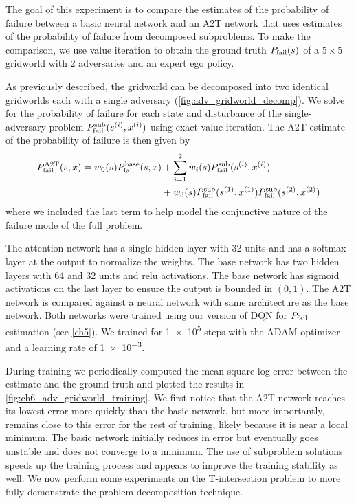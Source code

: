 The goal of this experiment is to compare the estimates of the probability of failure between a basic neural network and an A2T network that uses estimates of the probability of failure from decomposed subproblems. To make the comparison, we use value iteration to obtain the ground truth $P_{\rm fail}(s)$ of a $5 \times 5$ gridworld with \num{2} adversaries and an expert ego policy. 

As previously described, the gridworld can be decomposed into two identical gridworlds each with a single adversary (\cref{fig:adv_gridworld_decomp}). We solve for the probability of failure for each state and disturbance of the single-adversary problem $P^{\rm sub}_{\rm fail}(s^{(i)}, x^{(i)})$ using exact value iteration. The A2T estimate of the probability of failure is then given by
\begin{equation}
\begin{split}
    P^{\rm A2T}_{\rm fail}(s, x) = w_0(s) P_{\rm fail}^{\rm base}(s, x) &+ \sum_{i=1}^2 w_i(s) P^{\rm sub}_{\rm fail}(s^{(i)}, x^{(i)}) \\
    &+ w_3(s) P^{\rm sub}_{\rm fail}(s^{(1)}, x^{(1)})P^{\rm sub}_{\rm fail}(s^{(2)}, x^{(2)})
\end{split}
\end{equation}
where we included the last term to help model the conjunctive nature of the failure mode of the full problem. 

The attention network has a single hidden layer with \num{32} units and has a softmax layer at the output to normalize the weights. The base network has two hidden layers with \num{64} and \num{32} units and relu activations. The base network has sigmoid activations on the last layer to ensure the output is bounded in $(0,1)$. The A2T network is compared against a neural network with same architecture as the base network. Both networks were trained using our version of DQN for $P_{\rm fail}$ estimation (see \cref{ch5}). We trained for \num{1e5} steps with the ADAM optimizer and a learning rate of \num{1e-3}. 

During training we periodically computed the mean square log error between the estimate and the ground truth and plotted the results in \cref{fig:ch6_adv_gridworld_training}. We first notice that the A2T network reaches its lowest error more quickly than the basic network, but more importantly, remains close to this error for the rest of training, likely because it is near a local minimum. The basic network initially reduces in error but eventually goes unstable and does not converge to a minimum. The use of subproblem solutions speeds up the training process and appears to improve the training stability as well. We now perform some experiments on the T-intersection problem to more fully demonstrate the problem decomposition technique.

